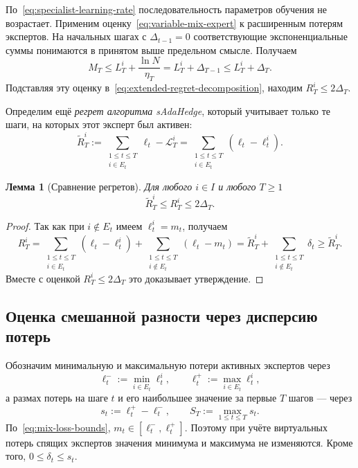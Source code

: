 \documentclass[a4paper,12pt]{article}
\theoremstyle{plain}
\newtheorem*{lemma}{Лемма}
\theoremstyle{definition}
\theoremstyle{remark}
\numberwithin{equation}{section}
\begin{document}
По~\eqref{eq:specialist-learning-rate} последовательность параметров обучения не возрастает. Применим оценку~\eqref{eq:variable-mix-expert} к расширенным потерям экспертов. На начальных шагах с $\Delta_{t-1}=0$ соответствующие экспоненциальные суммы понимаются в принятом выше предельном смысле. Получаем
\[
M_T\leqslant L_T^i+\frac{\ln N}{\eta_T}
    =L_T^i+\Delta_{T-1}
    \leqslant L_T^i+\Delta_T.
\]
Подставляя эту оценку в~\eqref{eq:extended-regret-decomposition}, находим $R_T^i\leqslant2\Delta_T$.

Определим ещё \textit{регрет алгоритма sAdaHedge}, который учитывает только те шаги, на которых этот эксперт был активен:
\begin{equation}
\label{eq:specialist-regret}
\widetilde R_T^i
:= \sum_{\substack{1\leqslant t\leqslant T\\i\in E_t}}\ell_t-\mathcal{L}_T^i
 = \sum_{\substack{1\leqslant t\leqslant T\\i\in E_t}}(\ell_t-\ell_t^i).
\end{equation}

\begin{lemma}[Сравнение регретов]
Для любого $i\in I$ и любого $T\geqslant1$
\begin{equation}
\label{eq:specialist-regret-gap}
\widetilde R_T^i\leqslant R_T^i\leqslant2\Delta_T.
\end{equation}
\end{lemma}

\begin{proof}
Так как при $i\notin E_t$ имеем $\ell_t^i=m_t$, получаем
\[
R_T^i
= \sum_{\substack{1\leqslant t\leqslant T\\i\in E_t}}(\ell_t-\ell_t^i)
 + \sum_{\substack{1\leqslant t\leqslant T\\i\notin E_t}}(\ell_t-m_t)
= \widetilde R_T^i
 + \sum_{\substack{1\leqslant t\leqslant T\\i\notin E_t}}\delta_t
\geqslant \widetilde R_T^i.
\]
Вместе с оценкой $R_T^i\leqslant2\Delta_T$ это доказывает утверждение.
\end{proof}

\subsection{Оценка смешанной разности через дисперсию потерь}

Обозначим минимальную и максимальную потери активных экспертов через
\[
\ell_t^- := \min_{i\in E_t}\ell_t^i,
\qquad
\ell_t^+ := \max_{i\in E_t}\ell_t^i,
\]
а размах потерь на шаге $t$ и его наибольшее значение за первые $T$ шагов --- через
\[
s_t := \ell_t^+-\ell_t^-,
\qquad S_T := \max_{1\leqslant t\leqslant T}s_t.
\]
По~\eqref{eq:mix-loss-bounds}, $m_t\in[\ell_t^-,\ell_t^+]$. Поэтому при учёте виртуальных потерь спящих экспертов значения минимума и максимума не изменяются. Кроме того, $0\leqslant\delta_t\leqslant s_t$.
\end{document}
